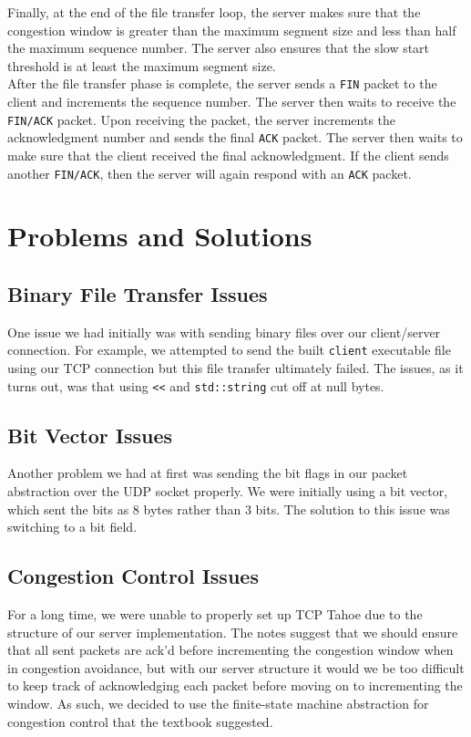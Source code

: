 \documentclass{article}
\begin{document}
\noindent
Finally, at the end of the file transfer loop, the server makes sure that the congestion window is greater than the maximum segment size and less than half the maximum sequence number. The server also ensures that the slow start threshold is at least the maximum segment size. \\

\noindent
After the file transfer phase is complete, the server sends a \texttt{FIN} packet to the client and increments the sequence number. The server then waits to receive the \texttt{FIN/ACK} packet. Upon receiving the packet, the server increments the acknowledgment number and sends the final \texttt{ACK} packet. The server then waits to make sure that the client received the final acknowledgment. If the client sends another \texttt{FIN/ACK}, then the server will again respond with an \texttt{ACK} packet.

\section{Problems and Solutions}

\subsection{Binary File Transfer Issues}

One issue we had initially was with sending binary files over our client/server connection. For example, we attempted to send the built \texttt{client} executable file using our TCP connection but this file transfer ultimately failed. The issues, as it turns out, was that using \texttt{<<} and \texttt{std::string} cut off at null bytes.

\subsection{Bit Vector Issues}

Another problem we had at first was sending the bit flags in our packet abstraction over the UDP socket properly. We were initially using a bit vector, which sent the bits as 8 bytes rather than 3 bits. The solution to this issue was switching to a bit field. 

\subsection{Congestion Control Issues}

For a long time, we were unable to properly set up TCP Tahoe due to the structure of our server implementation. The notes suggest that we should ensure that all sent packets are ack'd before incrementing the congestion window when in congestion avoidance, but with our server structure it would we be too difficult to keep track of acknowledging each packet before moving on to incrementing the window. As such, we decided to use the finite-state machine abstraction for congestion control that the textbook suggested.
\end{document}
